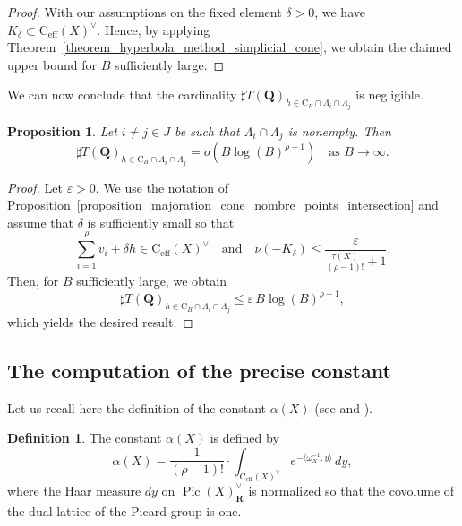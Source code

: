 \documentclass{proc-l}
\newcommand{\R}{\mathbf{R}}
\newcommand{\Q}{\mathbf{Q}}
\newcommand{\cone}{\text{C}_{\text{eff}}(X)}
\DeclareMathOperator{\Pic}{Pic}
\newcommand{\w}{\omega}
\newtheorem{prop}[theorem]{Proposition}
\theoremstyle{definition}
\newtheorem{definition}[theorem]{Definition}
\theoremstyle{remark}
\numberwithin{equation}{section}
\begin{document}
\begin{proof}
With our assumptions on the fixed element $\delta>0$, we have $K_\delta \subset \cone^{\vee}$.
Hence, by applying Theorem~\ref{theorem_hyperbola_method_simplicial_cone}, we obtain the claimed upper bound for $B$ sufficiently large.
\end{proof}



We can now conclude that the cardinality
$\sharp T(\Q)_{h \in \mathrm{C}_B \cap \Lambda_i \cap \Lambda_j}$
is negligible.

\begin{prop}\label{proposition_majoration_nombre_points_intersection}
Let $i \neq j \in J$ be such that $\Lambda_i \cap \Lambda_j$ is nonempty. Then
\[
\sharp T(\Q)_{h \in \mathrm{C}_B \cap \Lambda_i \cap \Lambda_j}
= o\!\left( B \log(B)^{\rho-1} \right)
\quad \text{as } B \to \infty.
\]
\end{prop}

\begin{proof}
Let $\varepsilon>0$. We use the notation of
Proposition~\ref{proposition_majoration_cone_nombre_points_intersection} and assume that $\delta$ is sufficiently small so that
\[
\sum_{i=1}^{\rho} v_i + \delta h \in \cone^{\vee}
\quad\text{and}\quad
\nu(-K_\delta) \leqslant \frac{\varepsilon}{\frac{\tau(X)}{(\rho - 1)!} + 1}.
\]
Then, for $B$ sufficiently large, we obtain
\[
\sharp T(\Q)_{h \in \mathrm{C}_B \cap \Lambda_i \cap \Lambda_j}
\leqslant \varepsilon\, B \log(B)^{\rho-1},
\]
which yields the desired result.
\end{proof}




\subsection{The computation of the precise constant}





Let us recall here the definition of the constant $\alpha(X)$ (see \cite[Definition 2.1]{peyre_duke} and \cite[Notations 2.6.1]{peyre_zeta_height_function}).

\begin{definition}\label{definition_effective_leading_constant}
The constant $\alpha(X)$ is defined by
$$
\alpha(X) = \frac{1}{(\rho - 1)!} \cdot \int_{\cone^{\vee}} e^{-\langle \w_{X}^{-1} , y \rangle } \, dy,
$$
where the Haar measure $dy$ on $\Pic(X)^{\vee}_{\R}$ is normalized so that the covolume of the dual lattice of the Picard group is one.
\end{definition}
\end{document}
